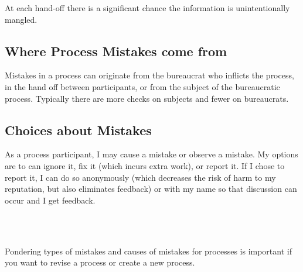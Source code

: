 At each hand-off there is a significant chance the information is unintentionally mangled. 

\subsection*{Where Process Mistakes come from}
Mistakes in a process can originate from the bureaucrat who inflicts the process, in the hand off between participants, or from the \gls{subject} of the bureaucratic process. Typically there are more checks on subjects and fewer on bureaucrats. 

\subsection*{Choices about Mistakes}
As a process participant, I may cause a mistake or observe a mistake. My options are to can ignore it, fix it (which incurs extra work), or report it. If I chose to report it, I can do so anonymously (which decreases the risk of harm to my reputation, but also eliminates feedback) or with my name so that discussion can occur and I get feedback.

\ \\

\noindent\hrulefill

\ \\

Pondering types of mistakes and causes of mistakes for processes is important if you want to revise a process or create a new process.